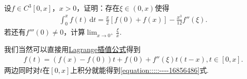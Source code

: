 \documentclass[../../main.tex]{subfiles}
\begin{document}
\begin{example}
设$f \in C^3[0,x]$，$x > 0$，证明：存在$\xi \in (0,x)$使得
\begin{align}\label{equation:::::----16856486}
\int_0^x f(t) \,\mathrm{d}t = \frac{x}{2}[f(0) + f(x)] - \frac{x^3}{12}f''(\xi).
\end{align}
若还有$f'''(0) \neq 0$，计算$\lim_{x \to 0^+} \frac{\xi}{x}.$
\end{example}
\begin{note}
我们当然可以直接用\hyperref[proposition:Lagrange插值公式]{Lagrange插值公式}得到
\begin{align*}
f\left( t \right) =\left( f\left( x \right) -f\left( 0 \right) \right) t+f\left( 0 \right) +f'' \left( \xi \right) t\left( t-x \right) ,t\in \left[ 0,x \right] .
\end{align*}
两边同时对$t$在$[0,x]$上积分就能得到\eqref{equation:::::----16856486}式.
\end{note}
\end{document}
